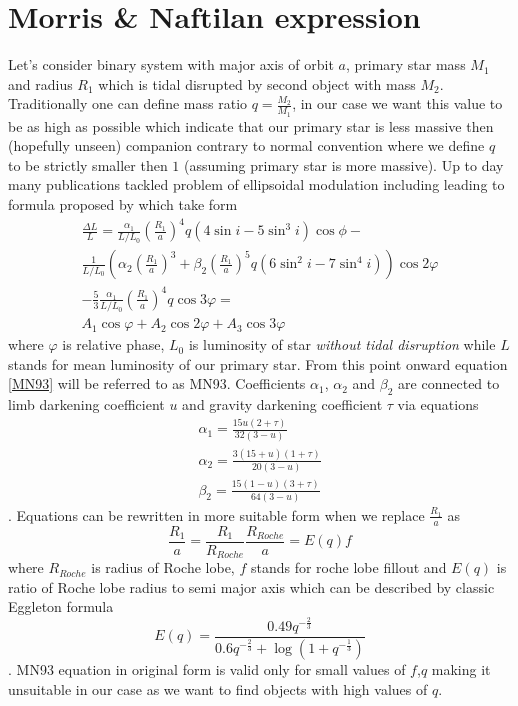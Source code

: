 \documentclass{pracalicmgr}
\begin{document}
\section{Morris \& Naftilan expression}
\hspace{1cm} Let's consider binary system with major axis of orbit $a$, primary star mass $M_1$ and radius $R_1$ which is tidal disrupted by second object with mass $M_2$.
Traditionally one can define mass ratio $q=\frac{M_2}{M_1}$, in our case we want this value to be as high as possible which indicate that our primary star
is less massive then (hopefully unseen) companion contrary to normal convention where we define $q$ to be strictly smaller then $1$ (assuming primary star is more massive).
Up to day many publications tackled problem of ellipsoidal modulation including \citep{kopal_close_1959} leading to formula proposed by \citep{morris_equations_1993} which take 
form 
\begin{align}\label{MN93}
    \frac{\Delta{L}}{L}=\frac{\alpha_1}{L/L_0}\left(\frac{R_1}{a}\right)^4q\left(4\sin{i}-5\sin^3{i}\right)\cos{\phi}- \\
    \frac{1}{L/L_0}\left(\alpha_2\left(\frac{R_1}{a}\right)^3+\beta_2
    \left(\frac{R_1}{a}\right)^5q\left(6\sin^2{i}-7\sin^4{i}\right)\right)\cos{2\varphi} \\
    -\frac{5}{3}\frac{\alpha_1}{L/L_0}\left(\frac{R_1}{a}\right)^4q\cos{3\varphi}=\\
    A_1\cos{\varphi}+A_2\cos{2\varphi}+A_3\cos{3\varphi}
\end{align}
where $\varphi$ is relative phase, $L_0$ is luminosity of star {\it without tidal disruption} while $L$ stands for mean luminosity of our primary star. From this point
onward equation \ref{MN93} will be referred to as MN93.
Coefficients $\alpha_1$, $\alpha_2$ and
$\beta_2$ are connected to limb darkening coefficient $u$ and gravity darkening coefficient $\tau$ via equations
\begin{align}
    \alpha_1=\frac{15u(2+\tau)}{32(3-u)}\\
    \alpha_2=\frac{3(15+u)(1+\tau)}{20(3-u)}\\
    \beta_2=\frac{15(1-u)(3+\tau)}{64(3-u)}
\end{align}. Equations can be rewritten in more suitable form when we replace $\frac{R_1}{a}$ as
$$\frac{R_1}{a}=\frac{R_1}{R_{Roche}}\frac{R_{Roche}}{a}=E(q)f$$ 
where $R_{Roche}$ 
is radius of Roche lobe, $f$ stands for roche lobe fillout and $E(q)$ is ratio of Roche lobe radius to semi major axis which can be described by classic Eggleton formula 
\citep{eggleton_approximations_1983}
\begin{equation}
    E(q)=\frac{0.49q^{-\frac{2}{3}}}{0.6q^{-\frac{2}{3}}+\log{(1+q^{-\frac{1}{3}})}}
\end{equation}. 
MN93 equation in original form is valid only for small values of $f$,$q$ making it unsuitable in our case as we want to find objects with high values of $q$.
\end{document}
